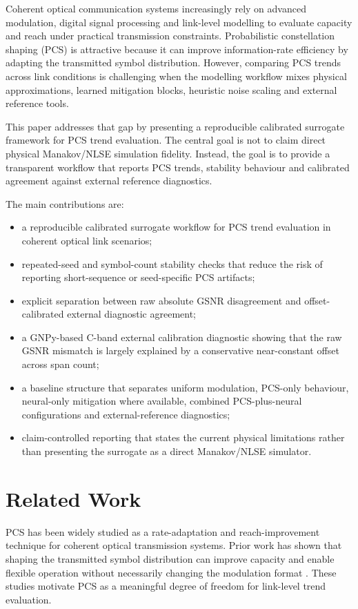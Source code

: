 ﻿\documentclass[pdflatex,sn-mathphys-num]{sn-jnl}
\begin{document}
Coherent optical communication systems increasingly rely on advanced modulation, digital signal processing and link-level modelling to evaluate capacity and reach under practical transmission constraints. Probabilistic constellation shaping (PCS) is attractive because it can improve information-rate efficiency by adapting the transmitted symbol distribution. However, comparing PCS trends across link conditions is challenging when the modelling workflow mixes physical approximations, learned mitigation blocks, heuristic noise scaling and external reference tools.

This paper addresses that gap by presenting a reproducible calibrated surrogate framework for PCS trend evaluation. The central goal is not to claim direct physical Manakov/NLSE simulation fidelity. Instead, the goal is to provide a transparent workflow that reports PCS trends, stability behaviour and calibrated agreement against external reference diagnostics.

The main contributions are:
\begin{itemize}
    \item a reproducible calibrated surrogate workflow for PCS trend evaluation in coherent optical link scenarios;
    \item repeated-seed and symbol-count stability checks that reduce the risk of reporting short-sequence or seed-specific PCS artifacts;
    \item explicit separation between raw absolute GSNR disagreement and offset-calibrated external diagnostic agreement;
    \item a GNPy-based C-band external calibration diagnostic showing that the raw GSNR mismatch is largely explained by a conservative near-constant offset across span count;
    \item a baseline structure that separates uniform modulation, PCS-only behaviour, neural-only mitigation where available, combined PCS-plus-neural configurations and external-reference diagnostics;
    \item claim-controlled reporting that states the current physical limitations rather than presenting the surrogate as a direct Manakov/NLSE simulator.
\end{itemize}

\section{Related Work}

PCS has been widely studied as a rate-adaptation and reach-improvement technique for coherent optical transmission systems. Prior work has shown that shaping the transmitted symbol distribution can improve capacity and enable flexible operation without necessarily changing the modulation format \cite{buchali2015pcs64qam,yankov2016constellation}. These studies motivate PCS as a meaningful degree of freedom for link-level trend evaluation.
\end{document}
